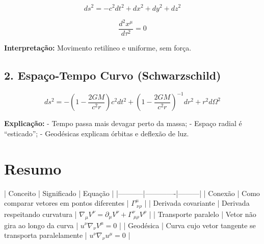 \documentclass[a4paper,12pt]{article}
\begin{document}
\[
ds^2 = -c^2 dt^2 + dx^2 + dy^2 + dz^2
\]

\[
\frac{d^2 x^\mu}{d\tau^2} = 0
\]

\textbf{Interpretação:} Movimento retilíneo e uniforme, sem força.

\subsection*{2. Espaço-Tempo Curvo (Schwarzschild)}

\[
ds^2 = -\left(1 - \frac{2GM}{c^2 r}\right)c^2 dt^2
+ \left(1 - \frac{2GM}{c^2 r}\right)^{-1} dr^2
+ r^2 d\Omega^2
\]

\textbf{Explicação:}  
- Tempo passa mais devagar perto da massa;  
- Espaço radial é “esticado”;  
- Geodésicas explicam órbitas e deflexão de luz.

\section*{Resumo}

| Conceito | Significado | Equação |
|-----------|-------------|---------|
| Conexão | Como comparar vetores em pontos diferentes | $\Gamma^{\mu}_{\ \nu\rho}$ |
| Derivada covariante | Derivada respeitando curvatura | $\nabla_\mu V^\nu = \partial_\mu V^\nu + \Gamma^{\nu}_{\ \mu\rho} V^\rho$ |
| Transporte paralelo | Vetor não gira ao longo da curva | $u^\nu \nabla_\nu V^\mu = 0$ |
| Geodésica | Curva cujo vetor tangente se transporta paralelamente | $u^\nu \nabla_\nu u^\mu = 0$ |
\end{document}
